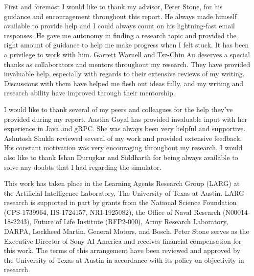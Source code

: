 \documentclass[12pt]{report}
\begin{document}
\justify 
\noindent

\thesiscopyrightpage                 

\thesiscertificationpage             

\thesistitlepage                     



\begin{thesisacknowledgments}       
First and foremost I would like to thank my advisor, Peter Stone, for his guidance and encouragement throughout this report. He always made himself available to provide help and I could always count on his lightning-fast email responses. He gave me autonomy in finding a research topic and provided the right amount of guidance to help me make progress when I felt stuck. It has been a privilege to work with him. Garrett Warnell and Tsz-Chiu Au deserves a special thanks as collaborators and mentors throughout my research. They have provided invaluable help, especially with regards to their extensive reviews of my writing. Discussions with them have helped me flesh out ideas fully, and my writing and research ability have improved through their mentorship.    

I would like to thank several of my peers and colleagues for the help they’ve provided during my report. Aastha Goyal has provided invaluable input with her experience in Java and gRPC. She was always been very helpful and supportive. Ashutosh Shukla reviewed several of my work and provided extensive feedback. His constant motivation was very encouraging throughout my research. I would also like to thank Ishan Durugkar and Siddharth for being always available to solve any doubts that I had regarding the simulator. 

This work has taken place in the Learning Agents Research Group (LARG) at the Artificial Intelligence Laboratory, The University of Texas at Austin.  LARG research is supported in part by grants from
the National Science Foundation (CPS-1739964, IIS-1724157, NRI-1925082), the Office of Naval Research (N00014-18-2243), Future of Life Institute (RFP2-000), Army Research Laboratory, DARPA, Lockheed
Martin, General Motors, and Bosch.  Peter Stone serves as the Executive Director of Sony AI America and receives financial compensation for this work.  The terms of this arrangement have been reviewed and approved by the University of Texas at Austin in accordance with its policy on objectivity in research. 

\end{thesisacknowledgments}          
\end{document}
